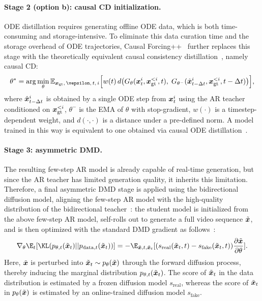 \paragraph{Stage 2 (option b): causal CD initialization.} ODE distillation requires generating offline ODE data, which is both time-consuming and storage-intensive. To eliminate this data curation time and the storage overhead of ODE trajectories, Causal Forcing++~\cite{zhao2026causal} further replaces this stage with the theoretically equivalent causal consistency distillation~\cite{song2023consistency}, namely causal CD:
\begin{align}
\label{eq:causal-cd}
\theta^*=\arg\min_\theta \mathbb{E}_{\vx_\text{gt},\,\vepsilon,\,t,\,i}\Big[w(t)\,d\big(G_\theta(\vx_t^i,\vx_\text{gt}^{<i}, t),\; G_{\theta^-}(\hat{\vx}^i_{t-\Delta t},\vx_\text{gt}^{<i}, t-\Delta t)\big)\Big],
\end{align}
where $\hat{{\bm{x}}}^i_{t-\Delta t}$ is obtained by a single ODE step from ${\bm{x}}_t^i$ using the AR teacher conditioned on ${\bm{x}}_\text{gt}^{<i}$, $\theta^-$ is the EMA of $\theta$ with stop-gradient, $w(\cdot)$ is a timestep-dependent weight, and $d(\cdot,\cdot)$ is a distance under a pre-defined norm. A model trained in this way is equivalent to one obtained via causal ODE distillation~\cite{zhu2026causal}.

\paragraph{Stage 3: asymmetric DMD.} The resulting few-step AR model is already capable of real-time generation, but since the AR teacher has limited generation quality, it inherits this limitation. Therefore, a final asymmetric DMD stage is applied using the bidirectional diffusion model, aligning the few-step AR model with the high-quality distribution of the bidirectional teacher~\cite{yin2025slow,huang2025self}: the student model is initialized from the above few-step AR model, self-rolls out to generate a full video sequence $\tilde{{\bm{x}}}$, and is then optimized with the standard DMD gradient as follows~\cite{wang2023prolificdreamer,yin2024one}:
\begin{align}
\label{eq:dmd}
\nabla_\theta\E_t[\KL(p_{\theta,t}(\tilde{\vx}_t)||p_{\text{data},t}(\tilde{\vx}_t))]
   = -\E_{\tilde{\vx}, t, \tilde{\vx}_t}[(s_\text{real}(\tilde{\vx}_t,t)-s_\text{fake}(\tilde{\vx}_t,t))\frac{\partial \tilde{\vx}}{\partial \theta}].
\end{align}
Here, $\tilde{{\bm{x}}}$ is perturbed into $\tilde{{\bm{x}}}_t\sim  p_\theta(\tilde{{\bm{x}}})$ through the forward diffusion process, thereby inducing the marginal distribution $p_{\theta,t}(\tilde{{\bm{x}}}_t)$. The score of $\tilde{{\bm{x}}}_t$ in the data distribution is estimated by a frozen diffusion model $s_{\text{real}}$, whereas the score of $\tilde{{\bm{x}}}_t$ in $p_\theta(\tilde{{\bm{x}}})$ is estimated by an online-trained diffusion model $s_{\text{fake}}$.


